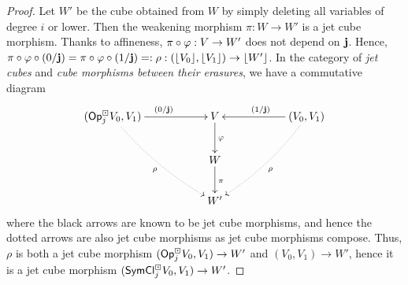 \documentclass[a4paper]{memoir}
\begin{document}
\begin{proof}
	Let $W'$ be the cube obtained from $W$ by simply deleting all variables of degree $i$ or lower.
	Then the weakening morphism $\pi : W \to W'$ is a jet cube morphism.
	Thanks to affineness, $\pi \circ \varphi : V \to W'$ does not depend on $\mathbf{j}$.
	Hence, $\pi \circ \varphi \circ (0/\mathbf{j}) = \pi \circ \varphi \circ (1/\mathbf{j}) =: \rho : (\mathopen{}\left\lfloor V_0 \right\rfloor\mathclose{}, \mathopen{}\left\lfloor V_1 \right\rfloor\mathclose{}) \to \mathopen{}\left\lfloor W' \right\rfloor\mathclose{}$.
	In the category of \emph{jet cubes} and \emph{cube morphisms between their erasures}, we have a commutative diagram
	\[
		\xymatrix{
			(\Opcube_j V_0, V_1)
				\ar@{.>}@/_/[rrdd]_{\rho}
				\ar[rr]^{(0/\dm j)}
			&&
			V
				\ar[d]^\vfi
			&&
			(V_0, V_1)
				\ar@{.>}@/^/[lldd]^{\rho}
				\ar[ll]_{(1/\dm j)}
			\\
			&& W
				\ar[d]^\pi
			\\
			&& W'
		}
	\]
	where the black arrows are known to be jet cube morphisms, and hence the dotted arrows are also jet cube morphisms as jet cube morphisms compose.
	Thus, $\rho$ is both a jet cube morphism $({\mathsf{Op}}^\boxdot_j V_0, V_1) \to W'$ and $(V_0, V_1) \to W'$, hence it is a jet cube morphism $(\mathsf{SymCl}^\boxdot_j V_0, V_1) \to W'$.
	

\end{proof}
\end{document}
